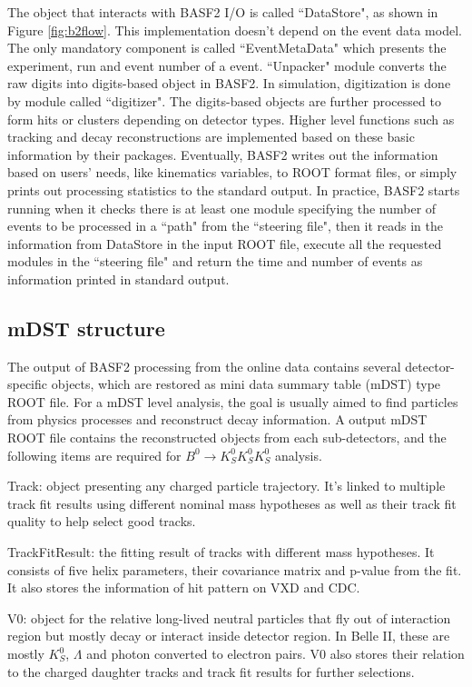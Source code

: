 The object that interacts with BASF2 I/O is called ``DataStore", as shown in Figure \ref{fig:b2flow}. This implementation doesn't depend on the event data model. The only mandatory component is called ``EventMetaData" which presents the experiment, run  and event number of a event. ``Unpacker" module converts the raw digits into digits-based object in BASF2. In simulation, digitization is done by module called ``digitizer". The digits-based objects are further processed to form hits or clusters depending on detector types. Higher level functions such as tracking and decay reconstructions are implemented based on these basic information by their packages. Eventually, BASF2 writes out the information based on users' needs, like kinematics variables, to ROOT\cite{ROOTcern} format files, or simply prints out processing statistics to the standard output. In practice, BASF2 starts running when it checks there is at least one module specifying the number of events to be processed in a ``path"  from the ``steering file", then it reads in the information from DataStore in the input ROOT file, execute all the requested modules in the ``steering file" and return the time and number of events as information printed in standard output.


\subsection{mDST structure}

The output of BASF2 processing from the online data contains several detector-specific objects, which are restored as mini data summary table (mDST) type ROOT file. For a mDST level analysis, the goal is usually aimed to find particles from physics processes and reconstruct decay information. A output mDST ROOT file contains the reconstructed objects from each sub-detectors, and the following items are required for $B^0 \to K_S^0  K_S^0  K_S^0$ analysis. 


\textbullet \space Track: object presenting any charged particle trajectory. It's linked to multiple track fit results using different nominal mass hypotheses as well as their track fit quality to help select good tracks.  

\textbullet \space TrackFitResult: the fitting result of tracks with different mass hypotheses. It consists of five helix parameters, their covariance matrix and p-value from the fit. It also stores the information of hit pattern on VXD and CDC. 

\textbullet \space V0: object for the relative long-lived neutral particles that fly out of interaction region but mostly decay or interact inside detector region. In Belle II, these are mostly $K_S^0$, $\Lambda$ and photon converted to electron pairs. V0 also stores their relation to the charged daughter tracks and track fit results for further selections.


